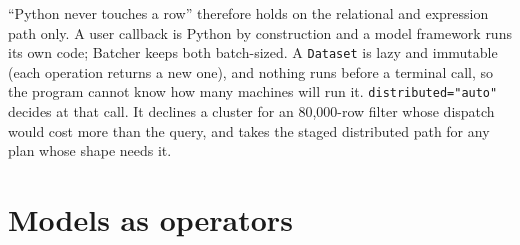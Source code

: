 \documentclass[10pt,twocolumn,letterpaper]{article}   %
\newcommand{\sys}{Batcher}
\begin{document}
``Python never touches a row'' therefore holds on the relational and expression path only. A
user callback is Python by construction and a model framework runs its own code; \sys{} keeps
both batch-sized. A \texttt{Dataset} is lazy and immutable (each operation returns a new one),
and nothing runs before a terminal call, so the program cannot know how many machines will run
it. \texttt{distributed="auto"} decides at that call. It declines a cluster for an
80{,}000-row filter whose dispatch would cost more than the query, and takes the staged
distributed path for any plan whose shape needs it.

\section{Models as operators}
\label{sec:pipeline}
\end{document}
